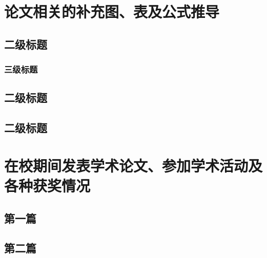 \documentclass[zihao = -4,linespread = 1.38889, heading = true]{ctexbook} %
\begin{document}
\gscaepappendix %

\section{论文相关的补充图、表及公式推导}
\subsection{二级标题}
\zhlipsum[1]
\subsubsection{三级标题}
\zhlipsum[1]
\subsection{二级标题}
\zhlipsum[1-2]
\subsection{二级标题}
\zhlipsum[1-2]

\section{在校期间发表学术论文、参加学术活动及各种获奖情况}
\subsection{第一篇}
\zhlipsum[1]

\subsection{第二篇}
\zhlipsum[1]
\end{document}
